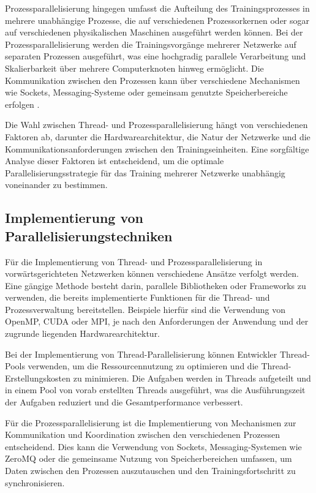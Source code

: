 Prozessparallelisierung hingegen umfasst die Aufteilung des Trainingsprozesses in mehrere unabhängige Prozesse, die auf verschiedenen Prozessorkernen oder sogar auf verschiedenen physikalischen Maschinen ausgeführt werden können. Bei der Prozessparallelisierung werden die Trainingsvorgänge mehrerer Netzwerke auf separaten Prozessen ausgeführt, was eine hochgradig parallele Verarbeitung und Skalierbarkeit über mehrere Computerknoten hinweg ermöglicht. Die Kommunikation zwischen den Prozessen kann über verschiedene Mechanismen wie Sockets, Messaging-Systeme oder gemeinsam genutzte Speicherbereiche erfolgen \citep{Flynn_Computer_Organizations_and_their_Effectiveness}.

Die Wahl zwischen Thread- und Prozessparallelisierung hängt von verschiedenen Faktoren ab, darunter die Hardwarearchitektur, die Natur der Netzwerke und die Kommunikationsanforderungen zwischen den Trainingseinheiten. Eine sorgfältige Analyse dieser Faktoren ist entscheidend, um die optimale Parallelisierungsstrategie für das Training mehrerer Netzwerke unabhängig voneinander zu bestimmen.

\subsection{Implementierung von Parallelisierungstechniken}
\label{sec:Grundlagen_Parallelisierung_Implementierung}
Für die Implementierung von Thread- und Prozessparallelisierung in vorwärtsgerichteten Netzwerken können verschiedene Ansätze verfolgt werden. Eine gängige Methode besteht darin, parallele Bibliotheken oder Frameworks zu verwenden, die bereits implementierte Funktionen für die Thread- und Prozessverwaltung bereitstellen. Beispiele hierfür sind die Verwendung von OpenMP, CUDA oder MPI, je nach den Anforderungen der Anwendung und der zugrunde liegenden Hardwarearchitektur.

Bei der Implementierung von Thread-Parallelisierung können Entwickler Thread-Pools verwenden, um die Ressourcennutzung zu optimieren und die Thread-Erstellungskosten zu minimieren. Die Aufgaben werden in Threads aufgeteilt und in einem Pool von vorab erstellten Threads ausgeführt, was die Ausführungszeit der Aufgaben reduziert und die Gesamtperformance verbessert.

Für die Prozessparallelisierung ist die Implementierung von Mechanismen zur Kommunikation und Koordination zwischen den verschiedenen Prozessen entscheidend. Dies kann die Verwendung von Sockets, Messaging-Systemen wie ZeroMQ oder die gemeinsame Nutzung von Speicherbereichen umfassen, um Daten zwischen den Prozessen auszutauschen und den Trainingsfortschritt zu synchronisieren.

